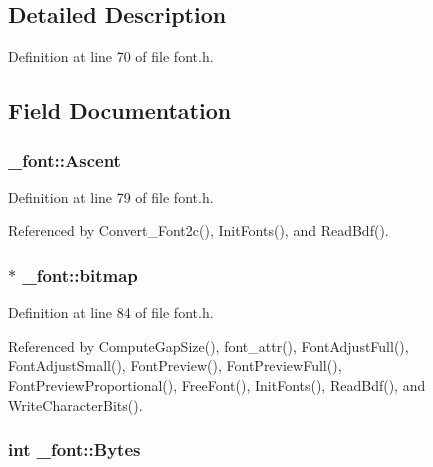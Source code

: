 \subsection{Detailed Description}


Definition at line 70 of file font.\+h.



\subsection{Field Documentation}
\subsubsection[{\texorpdfstring{Ascent}{Ascent}}]{ \+\_\+font\+::\+Ascent}\hypertarget{struct__font_a998e54724f56879aa85c5ec169873f39}{}\label{struct__font_a998e54724f56879aa85c5ec169873f39}


Definition at line 79 of file font.\+h.



Referenced by Convert\+\_\+\+Font2c(), Init\+Fonts(), and Read\+Bdf().

\subsubsection[{\texorpdfstring{bitmap}{bitmap}}]{ $\ast$ \+\_\+font\+::bitmap}\hypertarget{struct__font_a336f543c3fe3d3197c6e709fa7df0f5b}{}\label{struct__font_a336f543c3fe3d3197c6e709fa7df0f5b}


Definition at line 84 of file font.\+h.



Referenced by Compute\+Gap\+Size(), font\+\_\+attr(), Font\+Adjust\+Full(), Font\+Adjust\+Small(), Font\+Preview(), Font\+Preview\+Full(), Font\+Preview\+Proportional(), Free\+Font(), Init\+Fonts(), Read\+Bdf(), and Write\+Character\+Bits().

\subsubsection[{\texorpdfstring{Bytes}{Bytes}}]{\setlength{\rightskip}{0pt plus 5cm}int \+\_\+font\+::\+Bytes}\hypertarget{struct__font_a13b0b0e4e91f4d663ba4c3c11bfbda8a}{}\label{struct__font_a13b0b0e4e91f4d663ba4c3c11bfbda8a}


